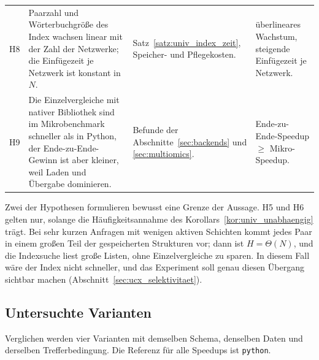 \begin{table}[!ht]
\begin{tabular}{@{}>{\raggedright\arraybackslash}p{0.9cm}>{\raggedright\arraybackslash}p{5.6cm}>{\raggedright\arraybackslash}p{3.6cm}>{\raggedright\arraybackslash}p{4.2cm}@{}}
		H8 & Paarzahl und Wörterbuchgröße des Index wachsen linear mit der Zahl der Netzwerke; die Einfügezeit je Netzwerk ist konstant in $N$. & Satz~\ref{satz:univ_index_zeit}, Speicher- und Pflegekosten. & überlineares Wachstum, steigende Einfügezeit je Netzwerk. \\
		H9 & Die Einzelvergleiche mit nativer Bibliothek sind im Mikrobenchmark schneller als in Python, der Ende-zu-Ende-Gewinn ist aber kleiner, weil Laden und Übergabe dominieren. & Befunde der Abschnitte~\ref{sec:backends} und \ref{sec:multiomics}. & Ende-zu-Ende-Speedup $\ge$ Mikro-Speedup. \\
		\bottomrule
	\end{tabular}
\end{table}

Zwei der Hypothesen formulieren bewusst eine Grenze der Aussage. H5 und H6 gelten nur, solange die Häufigkeitsannahme des Korollars~\ref{kor:univ_unabhaengig} trägt. Bei sehr kurzen Anfragen mit wenigen aktiven Schichten kommt jedes Paar in einem großen Teil der gespeicherten Strukturen vor; dann ist $H=\Theta(N)$, und die Indexsuche liest große Listen, ohne Einzelvergleiche zu sparen. In diesem Fall wäre der Index nicht schneller, und das Experiment soll genau diesen Übergang sichtbar machen (Abschnitt~\ref{sec:ucx_selektivitaet}).

\subsection{Untersuchte Varianten}
\label{sec:ucx_varianten}

Verglichen werden vier Varianten mit demselben Schema, denselben Daten und derselben Trefferbedingung. Die Referenz für alle Speedups ist \texttt{python}.

